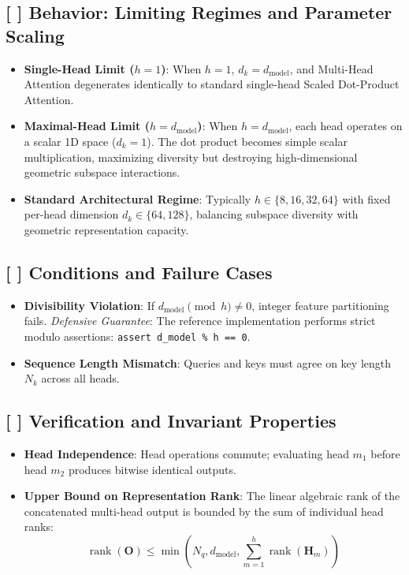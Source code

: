 \documentclass[11pt,a4paper]{article}
\theoremstyle{definition}
\begin{document}
\subsection{[ ] Behavior: Limiting Regimes and Parameter Scaling}
\begin{itemize}
    \item \textbf{Single-Head Limit ($h=1$)}: When $h=1$, $d_k = d_{\text{model}}$, and Multi-Head Attention degenerates identically to standard single-head Scaled Dot-Product Attention.
    \item \textbf{Maximal-Head Limit ($h=d_{\text{model}}$)}: When $h=d_{\text{model}}$, each head operates on a scalar 1D space ($d_k=1$). The dot product becomes simple scalar multiplication, maximizing diversity but destroying high-dimensional geometric subspace interactions.
    \item \textbf{Standard Architectural Regime}: Typically $h \in \{8, 16, 32, 64\}$ with fixed per-head dimension $d_k \in \{64, 128\}$, balancing subspace diversity with geometric representation capacity.
\end{itemize}

\subsection{[ ] Conditions and Failure Cases}
\begin{itemize}
    \item \textbf{Divisibility Violation}: If $d_{\text{model}} \pmod h \ne 0$, integer feature partitioning fails. \emph{Defensive Guarantee}: The reference implementation performs strict modulo assertions: \texttt{assert d\_model \% h == 0}.
    \item \textbf{Sequence Length Mismatch}: Queries and keys must agree on key length $N_k$ across all heads.
\end{itemize}

\subsection{[ ] Verification and Invariant Properties}
\begin{itemize}
    \item \textbf{Head Independence}: Head operations commute; evaluating head $m_1$ before head $m_2$ produces bitwise identical outputs.
    \item \textbf{Upper Bound on Representation Rank}: The linear algebraic rank of the concatenated multi-head output is bounded by the sum of individual head ranks:
    {\boldmath
    \begin{equation}
    \operatorname{rank}(\mathbf{O}) \le \min\left(N_q, d_{\text{model}}, \sum_{m=1}^h \operatorname{rank}(\mathbf{H}_m)\right)
    \end{equation}
    }
\end{itemize}
\end{document}
